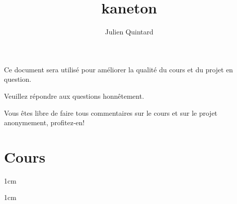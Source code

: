 %
%
%
%
%
%

%
%

\def\path{../..}

%
%



%
%


%
%

\title{kaneton}

%
%

\author{\small{Julien Quintard}}

%
%



%
%

\maketitle

%
%

\begin{center}

\scriptsize{Ce document sera utilis\'e pour am\'eliorer la qualit\'e du
  cours et du projet en question.}

\scriptsize{Veuillez r\'epondre aux questions honn\^etement.}

\scriptsize{Vous \^etes libre de faire tous commentaires sur le cours
  et sur le projet anonymement, profitez-en!}

\end{center}

%
%

%
%

\section{Cours}

         {1cm}

         {1cm}

